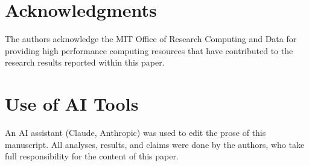\documentclass[conference]{IEEEtran}
\begin{document}
\section*{Acknowledgments}
The authors acknowledge the MIT Office of Research Computing and Data for
providing high performance computing resources that have contributed to the
research results reported within this paper.

\section*{Use of AI Tools}
An AI assistant (Claude, Anthropic) was used to edit the prose of this
manuscript. All analyses, 
results, and claims were done by the authors, who take full
responsibility for the content of this paper.


%
  {}%
  {}
\end{document}
